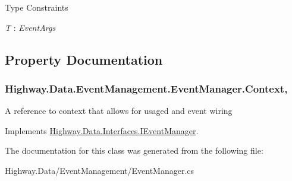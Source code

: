 \begin{Desc}
\item[Type Constraints]\begin{description}
\item[{\em T} : {\em Event\-Args}]\end{description}
\end{Desc}


\subsection{Property Documentation}
\hypertarget{class_highway_1_1_data_1_1_event_management_1_1_event_manager_ac5a9cddf17fcb4c3b298b3d50431de2f}{
\subsubsection[{Context}]{ Highway.\-Data.\-Event\-Management.\-Event\-Manager.\-Context\hspace{0.3cm}{\ttfamily [get]}, {\ttfamily [set]}}}\label{class_highway_1_1_data_1_1_event_management_1_1_event_manager_ac5a9cddf17fcb4c3b298b3d50431de2f}


A reference to context that allows for usaged and event wiring 



Implements \hyperlink{interface_highway_1_1_data_1_1_interfaces_1_1_i_event_manager_aae163759719833dca07513b02efbafa8}{Highway.\-Data.\-Interfaces.\-I\-Event\-Manager}.



The documentation for this class was generated from the following file\-:\begin{DoxyCompactItemize}
\item 
Highway.\-Data/\-Event\-Management/Event\-Manager.\-cs\end{DoxyCompactItemize}
